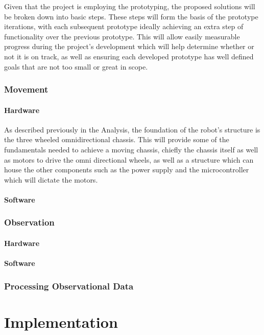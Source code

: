 	Given that the project is employing the prototyping, the proposed solutions will be broken down into basic steps. These steps will form the basis of the prototype iterations, with each subsequent prototype ideally achieving an extra step of functionality over the previous prototype. This will allow easily measurable progress during the project's development which will help determine whether or not it is on track, as well as ensuring each developed prototype has well defined goals that are not too small or great in scope.
	
		\subsection{Movement}
			\subsubsection{Hardware}
			As described previously in the Analysis, the foundation of the robot's structure is the three wheeled omnidirectional chassis. This will provide some of the fundamentals needed to achieve a moving chassis, chiefly the chassis itself as well as motors to drive the omni directional wheels, as well as a structure which can house the other components such as the power supply and the microcontroller which will dictate the motors.
			
			\subsubsection{Software}
		
		
		\subsection{Observation}
			\subsubsection{Hardware}
			\subsubsection{Software}
		
		\subsection{Processing Observational Data}
		
		
	\chapter{Implementation}
